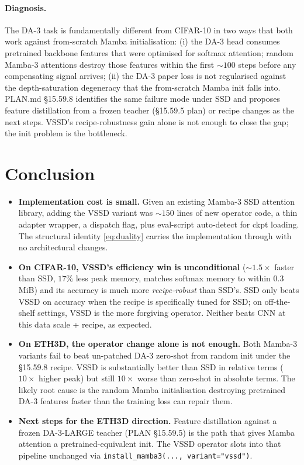 \documentclass[11pt,a4paper]{article}
\begin{document}
\paragraph{Diagnosis.}
The DA-3 task is fundamentally different from CIFAR-10 in two ways
that both work against from-scratch Mamba initialisation: (i) the
DA-3 head consumes pretrained backbone features that were optimised
for softmax attention; random Mamba-3 attentions destroy those
features within the first $\sim 100$ steps before any compensating
signal arrives; (ii) the DA-3 paper loss is not regularised against
the depth-saturation degeneracy that the from-scratch Mamba init
falls into. PLAN.md \S15.59.8 identifies the same failure mode
under SSD and proposes feature distillation from a frozen teacher
(\S15.59.5 plan) or recipe changes as the next steps. VSSD's
recipe-robustness gain alone is not enough to close the gap; the
init problem is the bottleneck.

\section{Conclusion}

\begin{itemize}
  \item \textbf{Implementation cost is small.} Given an existing
        Mamba-3 SSD attention library, adding the VSSD variant was
        $\sim 150$ lines of new operator code, a thin adapter wrapper,
        a dispatch flag, plus eval-script auto-detect for ckpt
        loading. The structural identity \eqref{eq:duality} carries
        the implementation through with no architectural changes.
  \item \textbf{On CIFAR-10, VSSD's efficiency win is unconditional}
        ($\sim 1.5\times$ faster than SSD, $17\%$ less peak memory,
        matches softmax memory to within $0.3$ MiB) and its accuracy
        is much more \emph{recipe-robust} than SSD's. SSD only
        beats VSSD on accuracy when the recipe is specifically tuned
        for SSD; on off-the-shelf settings, VSSD is the more
        forgiving operator. Neither beats CNN at this data scale +
        recipe, as expected.
  \item \textbf{On ETH3D, the operator change alone is not enough.}
        Both Mamba-3 variants fail to beat un-patched DA-3 zero-shot
        from random init under the \S15.59.8 recipe. VSSD is
        substantially better than SSD in relative terms ($10\times$
        higher peak) but still $10\times$ worse than zero-shot in
        absolute terms. The likely root cause is the random Mamba
        initialisation destroying pretrained DA-3 features faster
        than the training loss can repair them.
  \item \textbf{Next steps for the ETH3D direction.} Feature
        distillation against a frozen DA-3-LARGE teacher
        (PLAN \S15.59.5) is the path that gives Mamba attention a
        pretrained-equivalent init. The VSSD operator slots into
        that pipeline unchanged via
        \texttt{install\_mamba3(..., variant="vssd")}.
\end{itemize}
\end{document}
